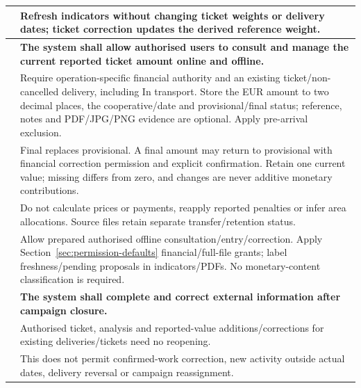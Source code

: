 {\begin{longtable}{L{0.18}L{0.82}}
\label{ac:052:b} & Refresh indicators without changing ticket weights or delivery dates; ticket correction updates the derived reference weight.\\
\midrule
{}
\label{fr:053}\textbf{} & \textbf{The system shall allow authorised users to consult and manage the current reported ticket amount online and offline.}\\*
\label{ac:053:a} & Require operation-specific financial authority and an existing ticket/non-cancelled delivery, including In transport. Store the EUR amount to two decimal places, the cooperative/date and provisional/final status; reference, notes and PDF/JPG/PNG evidence are optional. Apply  pre-arrival exclusion.\\
\label{ac:053:b} & Final replaces provisional. A final amount may return to provisional with financial correction permission and explicit confirmation. Retain one current value; missing differs from zero, and changes are never additive monetary contributions.\\
\label{ac:053:c} & Do not calculate prices or payments, reapply reported penalties or infer area allocations. Source files retain separate transfer/retention status.\\
\label{ac:053:d} & Allow prepared authorised offline consultation/entry/correction. Apply Section~\ref{sec:permission-defaults} financial/full-file grants; label freshness/pending proposals in indicators/PDFs. No monetary-content classification is required.\\
\midrule
{}
\label{fr:054}\textbf{} & \textbf{The system shall complete and correct external information after campaign closure.}\\*
\label{ac:054:a} & Authorised ticket, analysis and reported-value additions/corrections for existing deliveries/tickets need no reopening.\\
\label{ac:054:b} & This does not permit confirmed-work correction, new activity outside actual dates, delivery reversal or campaign reassignment.\\
\end{longtable}
}
